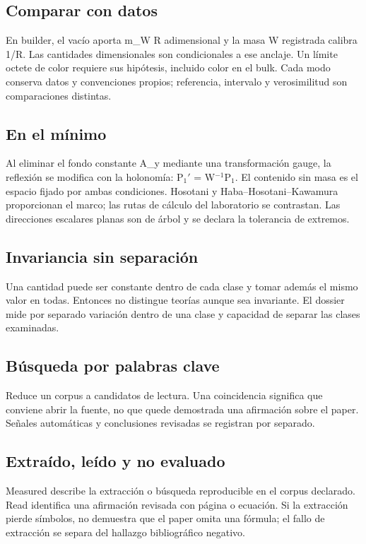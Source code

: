 \documentclass[11pt,a4paper]{article}
\begin{document}
\subsection*{Comparar con datos}
En builder, el vacío aporta m\_W R adimensional y la masa W registrada calibra 1/R. Las cantidades dimensionales son condicionales a ese anclaje. Un límite octete de color requiere sus hipótesis, incluido color en el bulk. Cada modo conserva datos y convenciones propios; referencia, intervalo y verosimilitud son comparaciones distintas.

\subsection*{En el mínimo}
Al eliminar el fondo constante A\_y mediante una transformación gauge, la reflexión se modifica con la holonomía: P\ensuremath{{}_{1}}\ensuremath{\prime} = W\ensuremath{{}^{-1}}P\ensuremath{{}_{1}}. El contenido sin masa es el espacio fijado por ambas condiciones. Hosotani y Haba--Hosotani--Kawamura proporcionan el marco; las rutas de cálculo del laboratorio se contrastan. Las direcciones escalares planas son de árbol y se declara la tolerancia de extremos.

\subsection*{Invariancia sin separación}
Una cantidad puede ser constante dentro de cada clase y tomar además el mismo valor en todas. Entonces no distingue teorías aunque sea invariante. El dossier mide por separado variación dentro de una clase y capacidad de separar las clases examinadas.

\subsection*{Búsqueda por palabras clave}
Reduce un corpus a candidatos de lectura. Una coincidencia significa que conviene abrir la fuente, no que quede demostrada una afirmación sobre el paper. Señales automáticas y conclusiones revisadas se registran por separado.

\subsection*{Extraído, leído y no evaluado}
Measured describe la extracción o búsqueda reproducible en el corpus declarado. Read identifica una afirmación revisada con página o ecuación. Si la extracción pierde símbolos, no demuestra que el paper omita una fórmula; el fallo de extracción se separa del hallazgo bibliográfico negativo.
\end{document}
